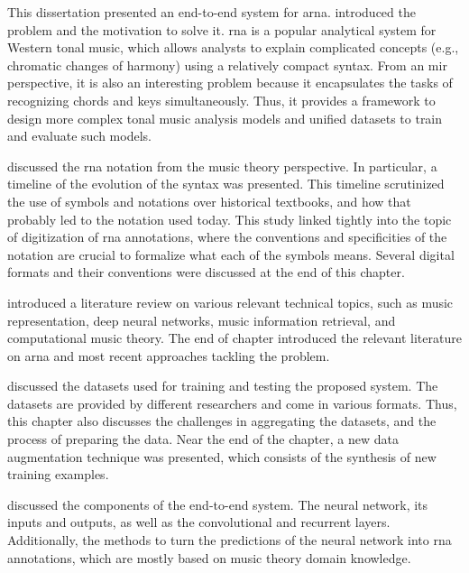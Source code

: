 
This dissertation presented an end-to-end system for
\gls{arna}.  introduced the problem
and the motivation to solve it. \gls{rna} is a popular
analytical system for Western tonal music, which allows
analysts to explain complicated concepts (e.g., chromatic
changes of harmony) using a relatively compact syntax. From
an \gls{mir} perspective, it is also an interesting problem
because it encapsulates the tasks of recognizing chords and
keys simultaneously. Thus, it provides a framework to design
more complex tonal music analysis models and unified
datasets to train and evaluate such models.

 discussed the
\gls{rna} notation from the music theory perspective. In
particular, a timeline of the evolution of the syntax was
presented. This timeline scrutinized the use of symbols and
notations over historical textbooks, and how that probably
led to the notation used today. This study linked tightly
into the topic of digitization of \gls{rna} annotations,
where the conventions and specificities of the notation are
crucial to formalize what each of the symbols means. Several
digital formats and their conventions were discussed at the
end of this chapter.

 introduced a literature review on
various relevant technical topics, such as music
representation, deep neural networks, music information
retrieval, and computational music theory. The end of
chapter introduced the relevant literature on \gls{arna}
and most recent approaches tackling the problem.

 discussed the
datasets used for training and testing the proposed system.
The datasets are provided by different researchers and come
in various formats. Thus, this chapter also discusses the
challenges in aggregating the datasets, and the process of
preparing the data. Near the end of the chapter, a new data
augmentation technique was presented, which consists of the
synthesis of new training examples.

 discussed the components of the
end-to-end system. The neural network, its inputs and
outputs, as well as the convolutional and recurrent layers.
Additionally, the methods to turn the predictions of the
neural network into \gls{rna} annotations, which are mostly
based on music theory domain knowledge.


